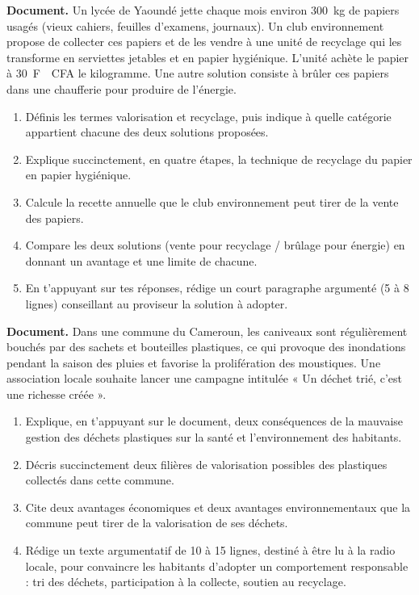 \documentclass[11pt]{article}
\newcommand{\cle}[1]{{\popxbold\color{popdark}#1}}
\begin{document}
\begin{exercice}
\textbf{Document.} Un lycée de Yaoundé jette chaque mois environ \SI{300}{kg} de papiers usagés (vieux cahiers, feuilles d'examens, journaux). Un club environnement propose de collecter ces papiers et de les vendre à une unité de recyclage qui les transforme en serviettes jetables et en papier hygiénique. L'unité achète le papier à \SI{30}{F\!CFA} le kilogramme. Une autre solution consiste à brûler ces papiers dans une chaufferie pour produire de l'énergie.
\begin{enumerate}
\item Définis les termes \cle{valorisation} et \cle{recyclage}, puis indique à quelle catégorie appartient chacune des deux solutions proposées.
\item Explique succinctement, en quatre étapes, la technique de recyclage du papier en papier hygiénique.
\item Calcule la recette annuelle que le club environnement peut tirer de la vente des papiers.
\item Compare les deux solutions (vente pour recyclage / brûlage pour énergie) en donnant un avantage et une limite de chacune.
\item En t'appuyant sur tes réponses, rédige un court paragraphe argumenté (5 à 8 lignes) conseillant au proviseur la solution à adopter.
\end{enumerate}
\end{exercice}

\begin{exercice}
\textbf{Document.} Dans une commune du Cameroun, les caniveaux sont régulièrement bouchés par des sachets et bouteilles plastiques, ce qui provoque des inondations pendant la saison des pluies et favorise la prolifération des moustiques. Une association locale souhaite lancer une campagne intitulée « Un déchet trié, c'est une richesse créée ».
\begin{enumerate}
\item Explique, en t'appuyant sur le document, deux conséquences de la mauvaise gestion des déchets plastiques sur la santé et l'environnement des habitants.
\item Décris succinctement deux filières de valorisation possibles des plastiques collectés dans cette commune.
\item Cite deux avantages économiques et deux avantages environnementaux que la commune peut tirer de la valorisation de ses déchets.
\item Rédige un texte argumentatif de 10 à 15 lignes, destiné à être lu à la radio locale, pour convaincre les habitants d'adopter un comportement responsable : tri des déchets, participation à la collecte, soutien au recyclage.
\end{enumerate}
\end{exercice}
\end{document}
